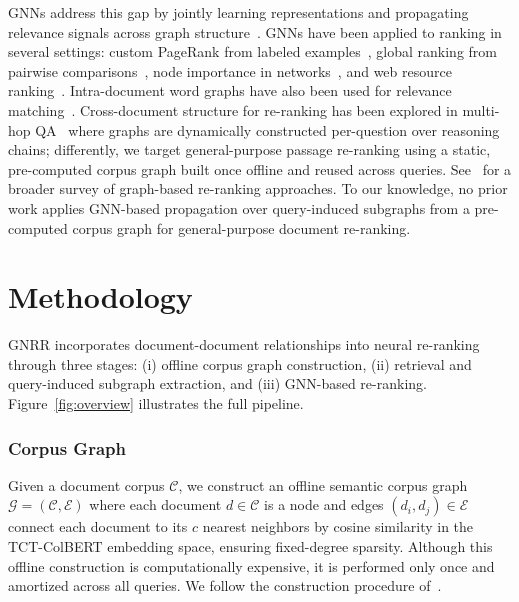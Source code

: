 \documentclass[runningheads]{llncs}
\newcommand{\ModelName}{GNRR\xspace}
\begin{document}
GNNs address this gap by jointly learning representations and propagating relevance signals across graph structure~\cite{messagepassing,everythingisconnected}. GNNs have been applied to ranking in several settings: custom PageRank from labeled examples~\cite{scarselli2005graph}, global ranking from pairwise comparisons~\cite{damke2021ranking,he2022gnnrank}, node importance in networks~\cite{liu2022learning,qu2023gnr}, and web resource ranking~\cite{ergashev2023learning}. Intra-document word graphs have also been used for relevance matching~\cite{graphofwords,graphofwords2}. Cross-document structure for re-ranking has been explored in multi-hop QA~\cite{nie2021answeringanyhopopendomainquestions} where graphs are dynamically constructed per-question over reasoning chains; differently, we target general-purpose passage re-ranking using a static, pre-computed corpus graph built once offline and reused across queries. See~\cite{zaoad2025graphbasedrerankingemergingtechniques} for a broader survey of graph-based re-ranking approaches. To our knowledge, no prior work applies GNN-based propagation over query-induced subgraphs from a pre-computed corpus graph for general-purpose document re-ranking.

\section{Methodology}
\label{sec:methodology}

\ModelName incorporates document-document relationships into neural re-ranking through three stages: (i) offline corpus graph construction, (ii) retrieval and query-induced subgraph extraction, and (iii) GNN-based re-ranking. Figure~\ref{fig:overview} illustrates the full pipeline.

\subsubsection*{Corpus Graph}
Given a document corpus $\mathcal{C}$, we construct an offline semantic corpus graph $\mathcal{G} = (\mathcal{C}, \mathcal{E})$ where each document $d \in \mathcal{C}$ is a node and edges $(d_i,d_j) \in \mathcal{E}$ connect each document to its $c$ nearest neighbors by cosine similarity in the TCT-ColBERT embedding space, ensuring fixed-degree sparsity. Although this offline construction is computationally expensive, it is performed only once and amortized across all queries.
We follow the construction procedure of~\cite{corpusgraph}.
\end{document}
